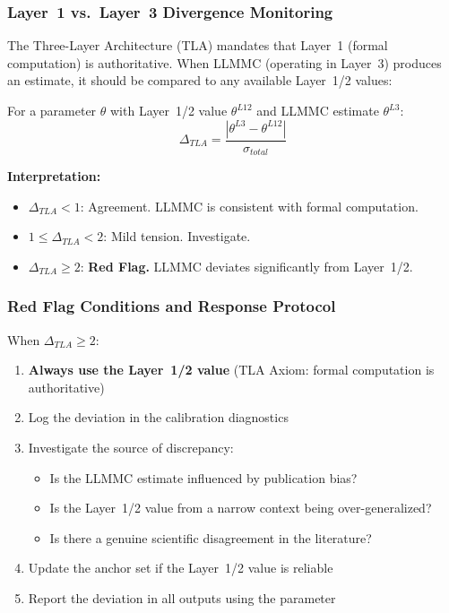 \subsubsection{Layer~1 vs.\ Layer~3 Divergence Monitoring}

The Three-Layer Architecture (TLA) mandates that Layer~1 (formal computation) is
authoritative. When LLMMC (operating in Layer~3) produces an estimate, it should be
compared to any available Layer~1/2 values:

\begin{definition}
\label{def:tla-deviation}
For a parameter $\theta$ with Layer~1/2 value $\theta^{L12}$ and LLMMC estimate
$\theta^{L3}$:
\begin{equation}
    \Delta_{TLA} = \frac{|\theta^{L3} - \theta^{L12}|}{\sigma_{total}}
    \label{eq:tla-deviation}
\end{equation}
\end{definition}

\textbf{Interpretation:}
\begin{itemize}[nosep]
    \item $\Delta_{TLA} < 1$: Agreement. LLMMC is consistent with formal computation.
    \item $1 \leq \Delta_{TLA} < 2$: Mild tension. Investigate.
    \item $\Delta_{TLA} \geq 2$: \textbf{Red Flag.} LLMMC deviates significantly
          from Layer~1/2.
\end{itemize}

\subsubsection{Red Flag Conditions and Response Protocol}

When $\Delta_{TLA} \geq 2$:
\begin{enumerate}[nosep]
    \item \textbf{Always use the Layer~1/2 value} (TLA Axiom: formal computation is
          authoritative)
    \item Log the deviation in the calibration diagnostics
    \item Investigate the source of discrepancy:
    \begin{itemize}[nosep]
        \item Is the LLMMC estimate influenced by publication bias?
        \item Is the Layer~1/2 value from a narrow context being over-generalized?
        \item Is there a genuine scientific disagreement in the literature?
    \end{itemize}
    \item Update the anchor set if the Layer~1/2 value is reliable
    \item Report the deviation in all outputs using the parameter
\end{enumerate}

